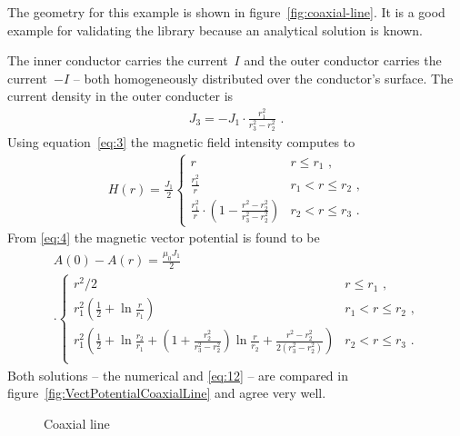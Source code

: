 The geometry for this example is shown in figure~\ref{fig:coaxial-line}.
It is a good example for validating the library because an analytical
solution is known.  \par The inner conductor carries the current~$I$
and the outer conductor carries the current~$-I$ -- both homogeneously
distributed over the conductor's surface.  The current density in the
outer conducter is
\begin{gather}
  J_3=-J_1\cdot\frac{r_1^2}{r_3^2-r_2^2}\text{~.}
\end{gather}
Using equation~\eqref{eq:3} the magnetic field intensity computes to
\begin{gather}
  H(r)= \frac{J_1}{2}
  \begin{cases}
    r & r \le r_1\text{~,} \\
    \frac{r_1^2}{r} & r_1 < r \le r_2\text{~,} \\
    \frac{r_1^2}{r}\cdot\left(1-\frac{r^2-r_2^2}{r_3^2-r_2^2}\right)
    & r_2 < r \le r_3\text{~.}
  \end{cases}
\end{gather}
From \eqref{eq:4} the magnetic vector potential is found to be
\begin{multline}
\label{eq:12}
  A(0)-A(r) = \frac{\mu_0J_1}{2} \\ \cdot
  \begin{cases}
    r^2/2 & r \le r_1\text{~,} \\
    r_1^2\left(\frac{1}{2}+\ln\frac{r}{r_1}\right)
    & r_1 < r \le r_2\text{~,} \\
    r_1^2\left(\frac{1}{2}+\ln\frac{r_2}{r_1}
      +(1+\frac{r_2^2}{r_3^2-r_2^2})\ln\frac{r}{r_2}
      +\frac{r^2-r_2^2}{2(r_3^2-r_2^2)}\right)
    & r_2 < r \le r_3\text{~.} \\
  \end{cases}
\end{multline}
Both solutions -- the numerical and \eqref{eq:12} -- are compared in
figure~\ref{fig:VectPotentialCoaxialLine} and agree very well.
\begin{figure}
  \centering
   \hfil
  \caption{Coaxial line}
\end{figure}

